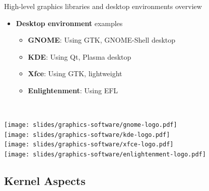 \begin{frame}{High-level graphics libraries and desktop environments overview}
\begin{minipage}[b]{0.8\textwidth}
\begin{itemize}
  \textit{gives a consistent look and feel across the system}
  \item \textbf{Desktop environment} examples
    \begin{itemize}
    \item \textbf{GNOME}: Using GTK, GNOME-Shell desktop
    \item \textbf{KDE}: Using Qt, Plasma desktop
    \item \textbf{Xfce}: Using GTK, lightweight
    \item \textbf{Enlightenment}: Using EFL
    \end{itemize}
  \end{itemize}
  \vfill~
  \end{minipage}
  \begin{minipage}[b]{0.09\textwidth}
  \centering
  \texttt{[image: slides/graphics-software/gnome-logo.pdf]}\\
  \vspace{1em}
  \texttt{[image: slides/graphics-software/kde-logo.pdf]}\\
  \vspace{1em}
  \texttt{[image: slides/graphics-software/xfce-logo.pdf]}\\
  \vspace{0.5em}
  \texttt{[image: slides/graphics-software/enlightenment-logo.pdf]}
  \end{minipage}
\end{frame}

\subsection{Kernel Aspects}

